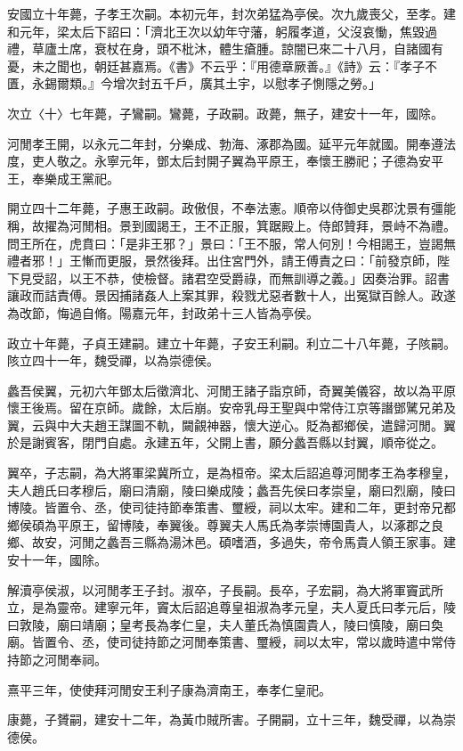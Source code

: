 \begin{pinyinscope}
安國立十年薨，子孝王次嗣。本初元年，封次弟猛為亭侯。次九歲喪父，至孝。建和元年，梁太后下詔曰：「濟北王次以幼年守藩，躬履孝道，父沒哀慟，焦毀過禮，草廬土席，衰杖在身，頭不枇沐，體生瘡腫。諒闇已來二十八月，自諸國有憂，未之聞也，朝廷甚嘉焉。《書》不云乎：『用德章厥善。』《詩》云：『孝子不匱，永錫爾類。』今增次封五千戶，廣其土宇，以慰孝子惻隱之勞。」

次立〈十〉七年薨，子鸞嗣。鸞薨，子政嗣。政薨，無子，建安十一年，國除。

河閒孝王開，以永元二年封，分樂成、勃海、涿郡為國。延平元年就國。開奉遵法度，吏人敬之。永寧元年，鄧太后封開子翼為平原王，奉懷王勝祀；子德為安平王，奉樂成王黨祀。

開立四十二年薨，子惠王政嗣。政傲佷，不奉法憲。順帝以侍御史吳郡沈景有彊能稱，故擢為河閒相。景到國謁王，王不正服，箕踞殿上。侍郎贊拜，景峙不為禮。問王所在，虎賁曰：「是非王邪？」景曰：「王不服，常人何別！今相謁王，豈謁無禮者邪！」王慚而更服，景然後拜。出住宮門外，請王傅責之曰：「前發京師，陛下見受詔，以王不恭，使檢督。諸君空受爵祿，而無訓導之義。」因奏治罪。詔書讓政而詰責傅。景因捕諸姦人上案其罪，殺戮尤惡者數十人，出冤獄百餘人。政遂為改節，悔過自脩。陽嘉元年，封政弟十三人皆為亭侯。

政立十年薨，子貞王建嗣。建立十年薨，子安王利嗣。利立二十八年薨，子陔嗣。陔立四十一年，魏受禪，以為崇德侯。

蠡吾侯翼，元初六年鄧太后徵濟北、河閒王諸子詣京師，奇翼美儀容，故以為平原懷王後焉。留在京師。歲餘，太后崩。安帝乳母王聖與中常侍江京等譖鄧騭兄弟及翼，云與中大夫趙王謀圖不軌，闚覦神器，懷大逆心。貶為都鄉侯，遣歸河閒。翼於是謝賓客，閉門自處。永建五年，父開上書，願分蠡吾縣以封翼，順帝從之。

翼卒，子志嗣，為大將軍梁冀所立，是為桓帝。梁太后詔追尊河閒孝王為孝穆皇，夫人趙氏曰孝穆后，廟曰清廟，陵曰樂成陵；蠡吾先侯曰孝崇皇，廟曰烈廟，陵曰博陵。皆置令、丞，使司徒持節奉策書、璽綬，祠以太牢。建和二年，更封帝兄都鄉侯碩為平原王，留博陵，奉翼後。尊翼夫人馬氏為孝崇博園貴人，以涿郡之良鄉、故安，河閒之蠡吾三縣為湯沐邑。碩嗜酒，多過失，帝令馬貴人領王家事。建安十一年，國除。

解瀆亭侯淑，以河閒孝王子封。淑卒，子長嗣。長卒，子宏嗣，為大將軍竇武所立，是為靈帝。建寧元年，竇太后詔追尊皇祖淑為孝元皇，夫人夏氏曰孝元后，陵曰敦陵，廟曰靖廟；皇考長為孝仁皇，夫人董氏為慎園貴人，陵曰慎陵，廟曰奐廟。皆置令、丞，使司徒持節之河閒奉策書、璽綬，祠以太牢，常以歲時遣中常侍持節之河閒奉祠。

熹平三年，使使拜河閒安王利子康為濟南王，奉孝仁皇祀。

康薨，子贇嗣，建安十二年，為黃巾賊所害。子開嗣，立十三年，魏受禪，以為崇德侯。


\end{pinyinscope}
